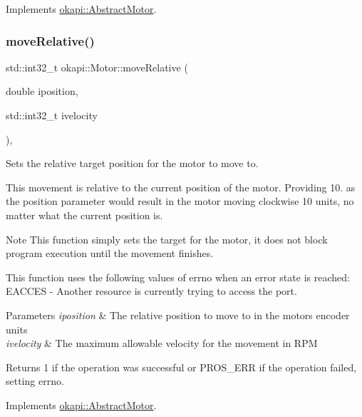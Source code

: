 Implements \mbox{\hyperlink{classokapi_1_1AbstractMotor_ab84ff0f3e39fa14dcf74bcc867863ff8}{okapi\+::\+Abstract\+Motor}}.

\mbox{\label{classokapi_1_1Motor_a40f6f70ed9b12d1834551d1232303ef1}} 
\subsubsection{\texorpdfstring{moveRelative()}{moveRelative()}}
{\footnotesize\ttfamily std\+::int32\+\_\+t okapi\+::\+Motor\+::move\+Relative (\begin{DoxyParamCaption}\item[{double}]{iposition,  }\item[{std\+::int32\+\_\+t}]{ivelocity }\end{DoxyParamCaption})\hspace{0.3cm}{\ttfamily [override]}, {\ttfamily [virtual]}}

Sets the relative target position for the motor to move to.

This movement is relative to the current position of the motor. Providing 10. as the position parameter would result in the motor moving clockwise 10 units, no matter what the current position is.

\begin{DoxyNote}{Note}
This function simply sets the target for the motor, it does not block program execution until the movement finishes.
\end{DoxyNote}
This function uses the following values of errno when an error state is reached\+: E\+A\+C\+C\+ES -\/ Another resource is currently trying to access the port.


\begin{DoxyParams}{Parameters}
{\em iposition} & The relative position to move to in the motor\textquotesingle{}s encoder units \\
\hline
{\em ivelocity} & The maximum allowable velocity for the movement in R\+PM \\
\hline
\end{DoxyParams}
\begin{DoxyReturn}{Returns}
1 if the operation was successful or P\+R\+O\+S\+\_\+\+E\+RR if the operation failed, setting errno. 
\end{DoxyReturn}


Implements \mbox{\hyperlink{classokapi_1_1AbstractMotor_a5a65d70a30f536593326cb754700e240}{okapi\+::\+Abstract\+Motor}}.

